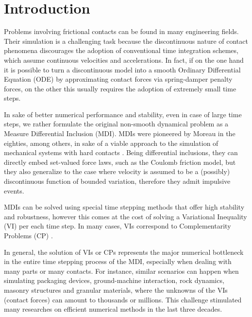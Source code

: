 \documentclass[AMA,STIX1COL]{WileyNJD-v2}
\begin{document}
\maketitle              %



\section{Introduction}

Problems involving frictional contacts can be found in many engineering fields. Their simulation is a challenging task because the discontinuous nature of contact phenomena discourages the adoption of conventional time integration schemes, which assume continuous velocities and accelerations. In fact, if on the one hand it is possible to turn a discontinuous model into a smooth Ordinary Differential Equation (ODE) by approximating contact forces via spring-damper penalty forces, on the other this usually requires the adoption of extremely small time steps. 

In sake of better numerical performance and stability, even in case of large time steps, we rather formulate the original non-smooth dynamical problem as a Measure Differential Inclusion (MDI). MDIs were pioneered by Moreau in the eighties, among others, in sake of a viable approach to the simulation of mechanical systems with hard contacts
\cite{mor88,Jean1992}. 
Being differential inclusions, they can directly embed set-valued force laws, such as the Coulomb friction model, but they also generalize to the case where velocity is assumed to be a (possibly) discontinuous function of bounded variation, therefore they admit impulsive events.

MDIs can be solved using special time stepping methods that offer high stability and robustness, however this comes at the cost of solving a  Variational Inequality (VI) per each time step. In many cases, VIs correspond to Complementarity Problems (CP) 
 \cite{acary2008numerical}.  

In general, the solution of VIs or CPs represents the major numerical bottleneck in the entire time stepping process of the MDI, especially when dealing with many parts or many contacts. For instance, similar scenarios can happen when simulating packaging devices, ground-machine interaction, rock dynamics, masonry structures and granular materials, where the unknowns of the VIs (contact forces) can amount to thousands or millions. This challenge stimulated many researches on efficient numerical methods in the last three decades.  
\end{document}
